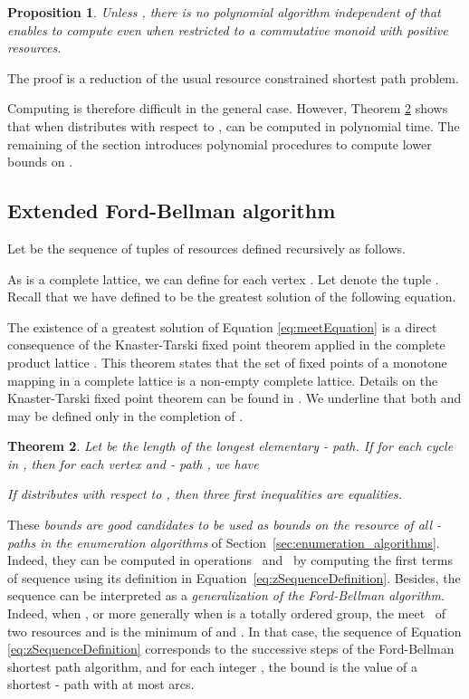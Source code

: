 \documentclass[11pt]{amsart}
\theoremstyle{plain}
\newtheorem{theo}{Theorem}
\newtheorem{prop}[theo]{Proposition}
\theoremstyle{remark}
\begin{document}
\begin{prop}\label{prop:bvoptComplexity}
Unless , there is no polynomial algorithm independent of  that enables to compute  even when restricted to a commutative monoid with positive resources.
\end{prop}
The proof is a reduction of the usual resource constrained shortest path problem.

Computing  is therefore difficult in the general case. However, Theorem \ref{theo:relationsBetweenBounds} shows that when  distributes with respect to ,  can be computed in polynomial time. The remaining of the section introduces polynomial procedures to compute lower bounds on . 

\subsection{Extended Ford-Bellman algorithm} \label{sub:extended_ford_bellman_algorithm}
Let  be the sequence of tuples of resources defined recursively as follows. 

As  is a complete lattice, we can define  for each vertex . Let  denote the tuple . Recall that we have defined  to be the greatest solution of the following equation.


\noindent The existence of a greatest solution of Equation \eqref{eq:meetEquation} is a direct consequence of the Knaster-Tarski fixed point theorem applied in the complete product lattice . This theorem states that the set of fixed points of a monotone mapping in a complete lattice is a non-empty complete lattice. Details on the Knaster-Tarski fixed point theorem can be found in \cite{davey2002introduction}. We underline that both  and  may be defined only in the completion of .  


\begin{theo}\label{theo:relationsBetweenBounds}
Let  be the length of the longest elementary - path. If  for each cycle  in , then for each vertex and - path , we have

If  distributes with respect to ,  then three first inequalities are equalities.
\end{theo}

These \emph{bounds  are good candidates to be used as bounds  on the resource  of all - paths  in the enumeration algorithms }of Section~\ref{sec:enumeration_algorithms}. Indeed, they can be computed in  operations~ and~ by computing the  first terms of sequence  using its definition in Equation~\eqref{eq:zSequenceDefinition}. Besides, the sequence  can be interpreted as a \emph{generalization of the Ford-Bellman algorithm}. Indeed, when , or more generally when  is a totally ordered group, the meet~ of two resources  and  is the minimum of  and . In that case, the sequence of Equation \eqref{eq:zSequenceDefinition} corresponds to the successive steps of the Ford-Bellman shortest path algorithm, and for each integer , the bound  is the value of a shortest - path with at most  arcs. 
\end{document}

